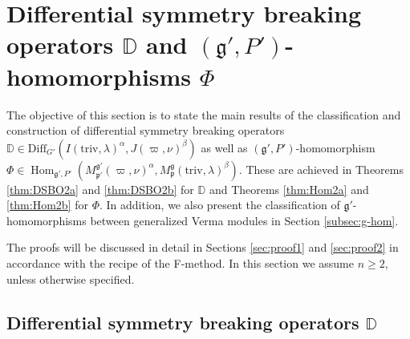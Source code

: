 \documentclass[reqno,11pt]{amsart}
\theoremstyle{remark}
\theoremstyle{definition}
\numberwithin{equation}{section}
\newcommand{\gb}{\beta}
\newcommand{\ga}{\alpha}
\newcommand{\fg}{{\mathfrak g}}
\newcommand{\fp}{{\mathfrak p}}
\newcommand{\Hom}{\operatorname{Hom}}
\newcommand{\Diff}{\mathrm{Diff}}
\newcommand{\triv}{\mathrm{triv}}
\newcommand{\Mp}{M^{\fg}_{\fp}}
\newcommand{\Mpp}{M^{\fg'}_{\fp'}}
\newcommand{\bD}{\mathbb{D}}
\begin{document}
\section{Differential symmetry breaking operators $\bD$ and $(\fg',P')$-homomorphisms $\Phi$}
\label{sec:results}

The objective of this section is to state the main results of 
the classification and 
construction of  
differential symmetry breaking operators 
$\bD \in \Diff_{G'}(I(\triv, \lambda)^\ga, J(\varpi,  \nu)^\beta)$ as well as 
$(\fg',P')$-homomorphism 
$\Phi \in \Hom_{\fg', P'}(\Mpp(\varpi,\nu)^\ga, \Mp(\triv, \lambda)^\gb)$.
These are achieved in Theorems
\ref{thm:DSBO2a} and
\ref{thm:DSBO2b}
for $\bD$ and Theorems 
\ref{thm:Hom2a}
and
\ref{thm:Hom2b}
for $\Phi$.
In addition, we also present the classification of $\fg'$-homomorphisms between
generalized Verma modules in Section \ref{subsec:g-hom}.

The proofs  will be discussed in detail in Sections \ref{sec:proof1} and 
\ref{sec:proof2} in accordance with the recipe of the F-method. 
In this section we assume $n\geq 2$, unless otherwise 
specified.

\subsection{Differential symmetry breaking operators $\bD$}
\label{sec:DSBO}
\end{document}

